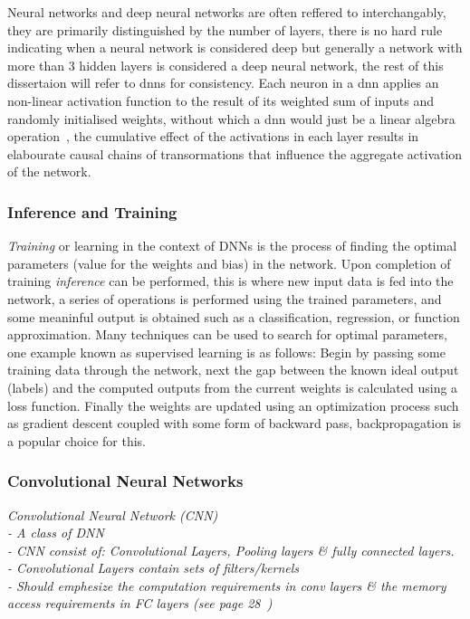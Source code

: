 \documentclass[../../D1.tex]{subfiles}
\begin{document}
Neural networks and deep neural networks are often reffered to interchangably, they are primarily distinguished by the number of layers, there is no hard rule indicating when a neural network is considered deep but generally a network with more than 3 hidden layers is considered a deep neural network, the rest of this dissertaion will refer to \acrshort{dnn}s for consistency. 
Each neuron in a \Acrshort{dnn} applies an non-linear activation function to the result of its weighted sum of inputs and randomly initialised weights, without which a \Acrshort{dnn} would just be a linear algebra operation~\autocite{szeEfficientProcessingDeep2017}, the cumulative effect of the activations in each layer results in elabourate causal chains of transormations that influence the aggregate activation of the network.

\subsubsection{Inference and Training}

\emph{Training} or learning in the context of DNNs is the process of finding the optimal parameters (value for the weights and bias) in the network.
Upon completion of training \emph{inference} can be performed, this is where new input data is fed into the network, a series of operations is performed using the trained parameters, and some meaninful output is obtained such as a classification, regression, or function approximation.
Many techniques can be used to search for optimal parameters, one example known as supervised learning is as follows: 
Begin by passing some training data through the network, next the gap between the known ideal output (labels) and the computed outputs from the current weights is calculated using a loss function. Finally the weights are updated using an optimization process such as gradient descent coupled with some form of backward pass, backpropagation is a popular choice for this.



\subsubsection{Convolutional Neural Networks}

\emph{Convolutional Neural Network (CNN)\\
    - A class of DNN\\
    - CNN consist of: Convolutional Layers, Pooling layers \& fully connected layers.\\
    - Convolutional Layers contain sets of filters/kernels\\
    - Should emphesize the computation requirements in conv layers \& the memory access requirements in FC layers (see page 28~\autocite{qiuGoingDeeperEmbedded2016})}
\end{document}
